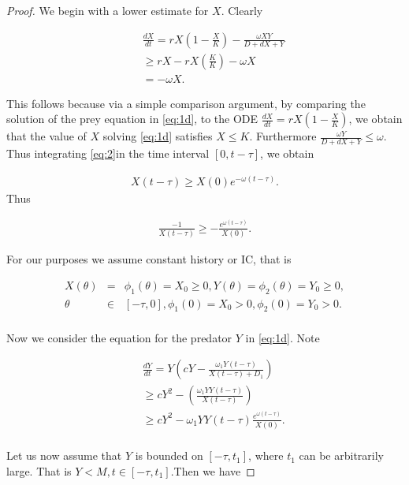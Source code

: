 \documentclass[10pt]{amsart}
\theoremstyle{definition}
\begin{document}
\begin{proof}
We begin with a lower estimate for $X$. Clearly

\begin{eqnarray}
\label{eq:2}
&& \frac{dX}{dt} = rX(1-\frac{X}{K})-\frac{\omega XY}{D+dX+Y}  \nonumber \\
&& \geq rX - rX(\frac{K}{K}) - \omega X \nonumber \\
&& = - \omega X. 
\end{eqnarray}

This follows because via a simple comparison argument, by comparing the solution of the prey equation in \eqref{eq:1d}, to the ODE $ \frac{dX}{dt} = rX(1-\frac{X}{K})$, we obtain that the value of $X$ solving \eqref{eq:1d} satisfies $X \leq K$. Furthermore $\frac{\omega Y}{D+dX+Y} \leq \omega$. Thus integrating \eqref{eq:2}in the time interval $[0,t-\tau]$, we obtain

\begin{eqnarray}
X(t-\tau) \geq X(0)e^{-\omega(t-\tau)}. 
\end{eqnarray}
Thus

\begin{eqnarray}
\frac{-1}{X(t-\tau)} \geq -\frac{e^{\omega(t-\tau)}}{X(0)}. 
\end{eqnarray}

For our purposes we assume constant history or IC, that is 

\begin{eqnarray}
X(\theta)&=&\phi_{1}(\theta) = X_{0} \geq 0, Y(\theta)= \phi_{2}(\theta) =Y_{0} \geq 0,\nonumber\\ 
\theta &\in& [-\tau, 0], \phi_{1}(0) =X_{0} >0, \phi_{2}(0) =Y_{0} >0.\nonumber\\
\end{eqnarray}

Now we consider the equation for the predator $Y$ in \eqref{eq:1d}. Note

\begin{eqnarray}
\label{eq:y1}
&&\frac{dY}{dt} = Y\left(cY-\frac{\omega_{1}Y(t-\tau)}{X(t-\tau)+D_{1}}\right) \nonumber \\
&& \geq cY^2 - \left(\frac{\omega_{1}Y Y(t-\tau)}{X(t-\tau)}\right) \nonumber \\
&& \geq cY^2 - \omega_{1}Y Y(t-\tau)\frac{e^{\omega(t-\tau)}}{X(0)}. \nonumber \\
\end{eqnarray}

Let us now assume that $Y$ is bounded on $[-\tau, t_{1}]$, where $t_{1}$ can be arbitrarily large. That is $Y<M, t \in [-\tau, t_{1}]$.Then we have 


\end{proof}
\end{document}

